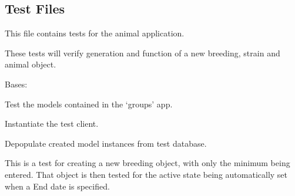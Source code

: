 \documentclass[letterpaper,10pt,english]{sphinxmanual}
\begin{document}
\subsection{Test Files}
\label{api:id5}\label{api:module-animal.tests}
This file contains tests for the animal application.

These tests will verify generation and function of a new breeding, strain and animal object.

\begin{fulllineitems}
\label{api:animal.tests.BreedingModelTests}
Bases: 

Test the models contained in the `groups' app.

\begin{fulllineitems}
\label{api:animal.tests.BreedingModelTests.setUp}
Instantiate the test client.

\end{fulllineitems}


\begin{fulllineitems}
\label{api:animal.tests.BreedingModelTests.tearDown}
Depopulate created model instances from test database.

\end{fulllineitems}


\begin{fulllineitems}
\label{api:animal.tests.BreedingModelTests.test_autoset_active_state}
This is a test for creating a new breeding object, with only the minimum being entered.  That object is then tested for the active state being automatically set when a End date is specified.

\end{fulllineitems}



\end{fulllineitems}
\end{document}
